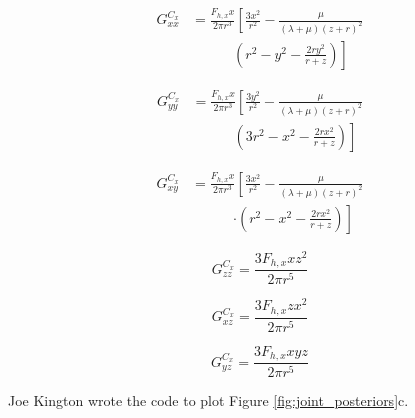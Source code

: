 \documentclass[twocolumn,jgrga]{AGUTeX}
\begin{document}
\begin{article}
{{\begin{equation}
\begin{split}
G_{xx}^{C_x} &= \frac{ F_{h,x} x }{2 \pi r^3} \left[ \frac{ 3x^2}{r^2} \right.
- \frac{\mu}{(\lambda + \mu)(z+r)^2} 
\\
&\qquad \quad  \left. (r^2 - y^2 - \frac{2ry^2}{r+z}) \right]
\end{split}
\end{equation}

\begin{equation}
\begin{split}
G_{yy}^{C_x} & = \frac{ F_{h,x} x }{2 \pi r^3} \left[ \frac{ 3y^2}{r^2} \right.
- \frac{\mu}{(\lambda + \mu)(z+r)^2} \\
& \qquad \quad \left. (3r^2 - x^2 - \frac{2rx^2}{r+z}) \right]
\end{split}
\end{equation}

\begin{equation}
\begin{split}
G_{xy}^{C_x} & = \frac{ F_{h,x} x }{2 \pi r^3} \left[ \frac{ 3x^2}{r^2} \right.
- \frac{\mu}{(\lambda + \mu)(z+r)^2} 
\\
&\qquad \quad \left. \cdot (r^2 - x^2 - \frac{2rx^2}{r+z}) \right]
\end{split}
\end{equation}

\begin{equation}
    G^{C_x}_{zz} = \frac{ 3 F_{h,x} x z^2 }{2 \pi r^5}
\end{equation}

\begin{equation}
    G^{C_x}_{xz} = \frac{ 3 F_{h,x} z x^2 }{2 \pi r^5}
\end{equation}

\begin{equation}
    G^{C_x}_{yz} = \frac{ 3 F_{h,x} x y z }{2 \pi r^5}
\end{equation}

\begin{acknowledgements}
Joe Kington wrote the code to plot Figure \ref{fig:joint_posteriors}c.
\end{acknowledgements}

%

}}
\end{article}
\end{document}
